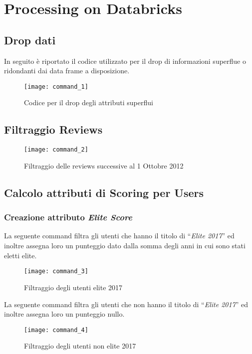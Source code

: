 
\chapter{Processing on Databricks}

\section{Drop dati}
In seguito è riportato il codice utilizzato per il drop di informazioni superflue
o ridondanti dai data frame a disposizione.
\begin{figure}[!htbp]
	\texttt{[image: command\_1]}
	\caption{Codice per il drop degli attributi superflui}
	\label{command_1}
\end{figure}

\clearpage

\section{Filtraggio Reviews}

\begin{figure}[!htbp]
	\texttt{[image: command\_2]}
	\caption{Filtraggio delle reviews successive al 1 Ottobre 2012}
	\label{command_2}
\end{figure}

\clearpage

\section{Calcolo attributi di Scoring per Users}
\subsection{Creazione attributo \textit{Elite Score}}
La seguente command filtra gli utenti che hanno il titolo di ``\textit{Elite 2017}''
ed inoltre assegna loro un punteggio dato dalla somma degli anni in cui sono
stati eletti elite.
\begin{figure}[!htbp]
	\texttt{[image: command\_3]}
	\caption{Filtraggio degli utenti elite 2017}
	\label{command_3}
\end{figure}

La seguente command filtra gli utenti che non hanno il titolo di ``\textit{Elite 2017}''
ed inoltre assegna loro un punteggio nullo.
\begin{figure}[!htbp]
	\texttt{[image: command\_4]}
	\caption{Filtraggio degli utenti non elite 2017}
	\label{command_4}
\end{figure}

